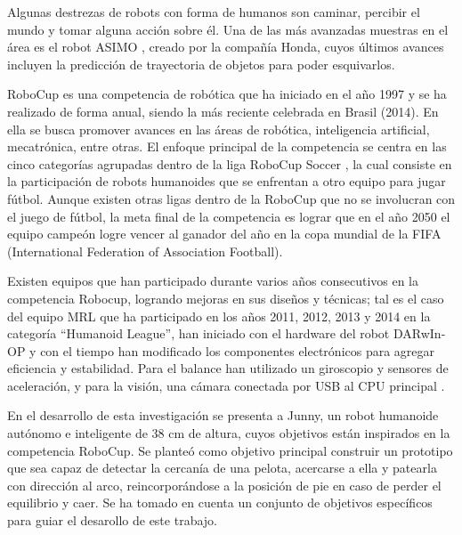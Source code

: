 Algunas destrezas de robots con forma de humanos son caminar, percibir el mundo y tomar alguna acción sobre él. Una de las más avanzadas muestras en el área es el robot ASIMO \cite{asimo}, creado por la compañía Honda, cuyos últimos avances incluyen la predicción de trayectoria de objetos para poder esquivarlos.  %

RoboCup \cite{robotcup} es una competencia de robótica que ha iniciado en el año 1997 y se ha realizado de forma anual, siendo la más reciente celebrada en Brasil (2014). En ella se busca promover avances en las áreas de robótica, inteligencia artificial, mecatrónica, entre otras. El enfoque principal de la competencia se centra en las cinco categorías agrupadas dentro de la liga RoboCup Soccer \cite{robotcupsoccer}, la cual consiste en la participación de robots humanoides que se enfrentan a otro equipo para jugar fútbol. Aunque existen otras ligas dentro de la RoboCup que no se involucran con el juego de fútbol, la meta final de la competencia es lograr que en el año 2050 el equipo campeón logre vencer al ganador del año en la copa mundial de la FIFA (International Federation of Association Football).

Existen equipos que han participado durante varios años consecutivos en la competencia Robocup, logrando mejoras en sus diseños y técnicas; tal es el caso del equipo MRL que ha participado en los años 2011, 2012, 2013 y 2014 en la categoría “Humanoid League”, han iniciado con el hardware del robot DARwIn-OP y con el tiempo han modificado los componentes electrónicos para agregar eficiencia y estabilidad. Para el balance han utilizado un giroscopio y sensores de aceleración, y para la visión, una cámara conectada por USB al CPU principal \cite{paper1}.

 

En el desarrollo de esta investigaci\'on se presenta a Junny, un robot humanoide aut\'onomo e inteligente de 38 cm de altura, cuyos objetivos están inspirados en la competencia RoboCup. Se planteó como objetivo principal construir un prototipo que sea capaz de detectar la cercanía de una pelota, acercarse a ella y patearla con direcci\'on al arco, reincorpor\'andose a la posici\'on de pie en caso de perder el equilibrio y caer. Se ha tomado en cuenta un conjunto de objetivos específicos para guiar el desarollo de este trabajo. %

